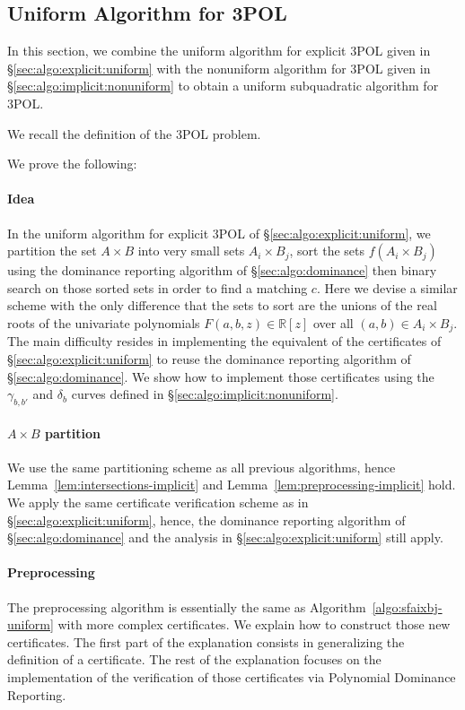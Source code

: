 \subsection{Uniform Algorithm for 3POL}%
\label{sec:algo:implicit:uniform}

In this section, we combine the uniform algorithm for explicit 3POL given in
\S\ref{sec:algo:explicit:uniform} with the nonuniform algorithm for
3POL given in \S\ref{sec:algo:implicit:nonuniform} to obtain a uniform
subquadratic algorithm for 3POL\@.

We recall the definition of the 3POL problem.
\ProblemPOLImplicit*

We prove the following:
\TheoremPOLUniformImplicit*

\paragraph{Idea}
In the uniform algorithm for explicit 3POL of
\S\ref{sec:algo:explicit:uniform}, we partition the set $A \times B$
into very small sets $A_i \times B_j$, sort the sets $f(A_i \times B_j)$ using
the dominance reporting algorithm of \S\ref{sec:algo:dominance} then
binary search on those sorted sets in order to find a matching $c$.
%
Here we devise a similar scheme with the only difference that the sets to sort
are the unions of the real roots of the univariate polynomials
$F(a,b,z)\in\mathbb{R}[z]$ over all $(a,b) \in A_i \times B_j$.
%
The main difficulty resides in implementing the
equivalent of the certificates of \S\ref{sec:algo:explicit:uniform} to reuse
the dominance reporting algorithm of \S\ref{sec:algo:dominance}. We show how to
implement those certificates using the $\gamma_{b,b'}$ and $\delta_b$ curves
defined in \S\ref{sec:algo:implicit:nonuniform}.

\paragraph{$A \times B$ partition}
We use the same partitioning scheme as all previous
algorithms, hence Lemma~\ref{lem:intersections-implicit} and
Lemma~\ref{lem:preprocessing-implicit} hold. We apply the same certificate verification
scheme as in \S\ref{sec:algo:explicit:uniform}, hence, the dominance
reporting algorithm of \S\ref{sec:algo:dominance} and the analysis
in \S\ref{sec:algo:explicit:uniform} still apply.

\paragraph{Preprocessing}
The preprocessing algorithm is essentially the same as
Algorithm~\ref{algo:sfaixbj-uniform} with more complex certificates. We explain how to
construct those new certificates. The first part of the explanation consists in
generalizing the definition of a certificate. The rest of the
explanation focuses on the implementation of the verification of those
certificates via Polynomial Dominance Reporting.

